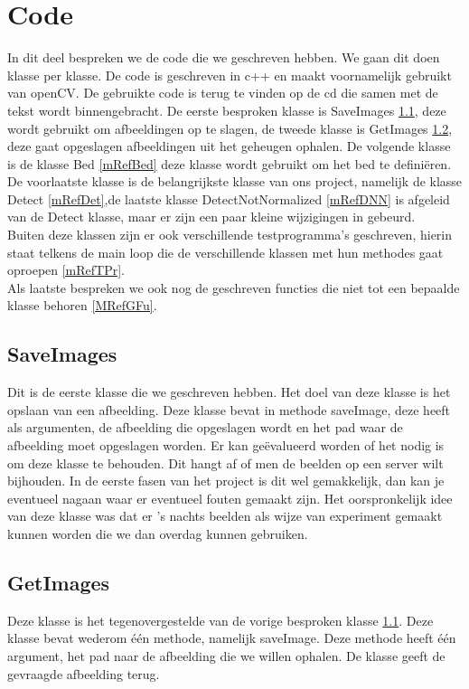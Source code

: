 \section{Code}
\label{mrefCod}
In dit deel bespreken we de code die we geschreven hebben. We gaan dit doen klasse per klasse. De code is geschreven in c++ en maakt voornamelijk gebruikt van openCV. De gebruikte code is terug te vinden op de cd die samen met de tekst wordt binnengebracht. De eerste besproken klasse is SaveImages \ref{mRefSIm}, deze wordt gebruikt om afbeeldingen op te slagen, de tweede klasse is GetImages \ref{mRefGIm}, deze gaat opgeslagen afbeeldingen uit het geheugen ophalen. De volgende klasse is de klasse Bed \ref{mRefBed} deze klasse wordt gebruikt om het bed te defini\"eren. De voorlaatste klasse is de belangrijkste klasse van ons project, namelijk de klasse Detect \ref{mRefDet},de laatste klasse DetectNotNormalized \ref{mRefDNN} is afgeleid van de Detect klasse, maar er zijn een paar kleine wijzigingen in gebeurd.\\ 
Buiten deze klassen zijn er ook verschillende testprogramma's geschreven, hierin staat telkens de main loop die de verschillende klassen met hun methodes gaat oproepen \ref{mRefTPr}.\\
Als laatste bespreken we ook nog de geschreven functies die niet tot een bepaalde klasse behoren \ref{MRefGFu}.

\subsection{SaveImages}
\label{mRefSIm}
Dit is de eerste klasse die we geschreven hebben. Het doel van deze klasse is het opslaan van een afbeelding. Deze klasse bevat in methode saveImage, deze heeft als argumenten, de afbeelding die opgeslagen wordt en het pad waar de afbeelding moet opgeslagen worden.  
Er kan ge\"evalueerd worden of het nodig is om deze klasse te behouden. Dit hangt af of men de beelden op een server wilt bijhouden. In de eerste fasen van het project is dit wel gemakkelijk, dan kan je eventueel nagaan waar er eventueel fouten gemaakt zijn. 
Het oorspronkelijk idee van deze klasse was dat er 's nachts beelden als wijze van experiment gemaakt kunnen worden die we dan overdag kunnen gebruiken.

\subsection{GetImages}
\label{mRefGIm}
Deze klasse is het tegenovergestelde van de vorige besproken klasse \ref{mRefSIm}. Deze klasse bevat wederom \'e\'en methode, namelijk saveImage. Deze methode heeft \'e\'en argument, het pad naar de afbeelding die we willen ophalen. De klasse geeft de gevraagde afbeelding terug.

